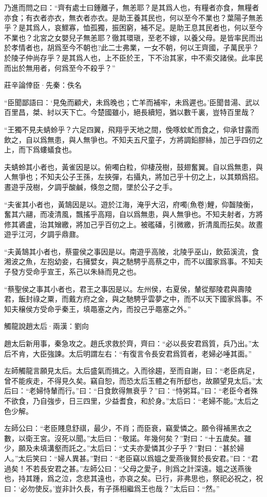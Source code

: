 \documentclass[12pt,a4paper]{ctexbook}
\begin{document}
乃進而問之曰：“齊有處士曰鍾離子，無恙耶？是其爲人也，有糧者亦食，無糧者亦食；有衣者亦衣，無衣者亦衣。是助王養其民也，何以至今不業也？葉陽子無恙乎？是其爲人，哀鰥寡，恤孤獨，振困窮，補不足。是助王息其民者也，何以至今不業也？北宮之女嬰兒子無恙耶？徹其環瑱，至老不嫁，以養父母。是皆率民而出於孝情者也，胡爲至今不朝也?此二士弗業，一女不朝，何以王齊國，子萬民乎？於陵子仲尚存乎？是其爲人也，上不臣於王，下不治其家，中不索交諸侯。此率民而出於無用者，何爲至今不殺乎？”\par
莊辛論倖臣·先秦：佚名 \par
“臣聞鄙語曰：‘見兔而顧犬，未爲晚也；亡羊而補牢，未爲遲也。’臣聞昔湯、武以百里昌，桀、紂以天下亡。今楚國雖小，絕長續短，猶以數千裏，豈特百里哉？\par
“王獨不見夫蜻蛉乎？六足四翼，飛翔乎天地之間，俛啄蚊虻而食之，仰承甘露而飲之，自以爲無患，與人無爭也。不知夫五尺童子，方將調鉛膠絲，加己乎四仞之上，而下爲螻蟻食也。\par
夫蜻蛉其小者也，黃雀因是以。俯噣白粒，仰棲茂樹，鼓翅奮翼。自以爲無患，與人無爭也；不知夫公子王孫，左挾彈，右攝丸，將加己乎十仞之上，以其類爲招。晝遊乎茂樹，夕調乎酸鹹，倏忽之間，墜於公子之手。\par
“夫雀其小者也，黃鵠因是以。遊於江海，淹乎大沼，府噣(魚卷)鯉，仰齧陵衡，奮其六翮，而凌清風，飄搖乎高翔，自以爲無患，與人無爭也。不知夫射者，方將修其碆盧，治其矰繳，將加己乎百仞之上。被礛磻，引微繳，折清風而抎矣。故晝遊乎江河，夕調乎鼎鼐。\par
“夫黃鵠其小者也，蔡靈侯之事因是以。南遊乎高陂，北陵乎巫山，飲茹溪流，食湘波之魚，左抱幼妾，右擁嬖女，與之馳騁乎高蔡之中，而不以國家爲事。不知夫子發方受命乎宣王，系己以朱絲而見之也。\par
“蔡聖侯之事其小者也，君王之事因是以。左州侯，右夏侯，輦從鄢陵君與壽陵君，飯封祿之粟，而戴方府之金，與之馳騁乎雲夢之中，而不以天下國家爲事。不知夫穣侯方受命乎秦王，填黽塞之內，而投己乎黽塞之外。”\par
觸龍說趙太后·兩漢：劉向 \par
趙太后新用事，秦急攻之。趙氏求救於齊，齊曰：“必以長安君爲質，兵乃出。”太后不肯，大臣強諫。太后明謂左右：“有復言令長安君爲質者，老婦必唾其面。”\par
左師觸龍言願見太后。太后盛氣而揖之。入而徐趨，至而自謝，曰：“老臣病足，曾不能疾走，不得見久矣。竊自恕，而恐太后玉體之有所郄也，故願望見太后。”太后曰：“老婦恃輦而行。”曰：“日食飲得無衰乎？”曰：“恃粥耳。”曰：“老臣今者殊不欲食，乃自強步，日三四里，少益耆食，和於身。”太后曰：“老婦不能。”太后之色少解。\par
左師公曰：“老臣賤息舒祺，最少，不肖；而臣衰，竊愛憐之。願令得補黑衣之數，以衛王宮。沒死以聞。”太后曰：“敬諾。年幾何矣？”對曰：“十五歲矣。雖少，願及未填溝壑而託之。”太后曰：“丈夫亦愛憐其少子乎？”對曰：“甚於婦人。”太后笑曰：“婦人異甚。”對曰：“老臣竊以爲媼之愛燕後賢於長安君。”曰：“君過矣！不若長安君之甚。”左師公曰：“父母之愛子，則爲之計深遠。媼之送燕後也，持其踵，爲之泣，念悲其遠也，亦哀之矣。已行，非弗思也，祭祀必祝之，祝曰：‘必勿使反。’豈非計久長，有子孫相繼爲王也哉？”太后曰：“然。”\par
\end{document}
